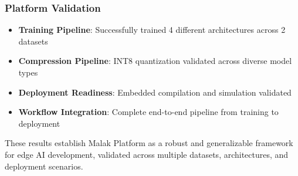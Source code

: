 \subsubsection{Platform Validation}
\begin{itemize}
\item \textbf{Training Pipeline}: Successfully trained 4 different architectures across 2 datasets
\item \textbf{Compression Pipeline}: INT8 quantization validated across diverse model types
\item \textbf{Deployment Readiness}: Embedded compilation and simulation validated
\item \textbf{Workflow Integration}: Complete end-to-end pipeline from training to deployment
\end{itemize}

These results establish Malak Platform as a robust and generalizable framework for edge AI development, validated across multiple datasets, architectures, and deployment scenarios.
